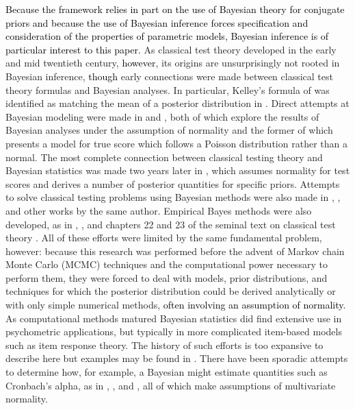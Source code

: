 \documentclass[12pt,epsfig]{article}
\newcommand{\change}[1]{\textcolor{black}{#1}}
\begin{document}
 \change{Because the framework relies in part on the use of Bayesian theory for conjugate priors and because the use of Bayesian inference forces specification and consideration of the properties of parametric models, Bayesian inference is of particular interest to this paper.} As classical test theory developed in the early and mid twentieth century, \change{however}, its origins are unsurprisingly not rooted in Bayesian inference, \change{though} early connections were made between classical test theory formulas and Bayesian analyses. In particular, Kelley's formula of \cite{Kelley1923} was identified as matching the mean of a posterior distribution in \cite{Novick1969}. Direct attempts at Bayesian modeling were made in \cite{Novick1969_thefirst} and \cite{Novick1969_thesecond}, both of which explore the results of Bayesian analyses under the assumption of normality and the former of which presents a model for true score which follows a Poisson distribution rather than a normal. The most complete connection between classical testing theory and Bayesian statistics was made two years later in \cite{Novick1971}, which assumes normality for test scores and derives a number of posterior quantities for specific priors. Attempts to solve classical testing problems using Bayesian methods were also made in \cite{Lindley1969}, \cite{Lindley1969b}, and other works by the same author. Empirical Bayes methods were also developed, as in \cite{Lord1965}, \cite{Lord1969}, and chapters 22 and 23 of the seminal text on classical test theory \cite{Lord1968}.  All of these efforts were limited by the same fundamental problem, however: because this research was performed before the advent of Markov chain Monte Carlo (MCMC) techniques and the computational power necessary to perform them, they were forced to deal with models, prior distributions, and techniques for which the posterior distribution could be derived analytically or with only simple numerical methods, \change{often involving an assumption of normality}. As computational methods matured Bayesian statistics did find extensive use in psychometric applications, but typically in more complicated item-based models such as item response theory. The history of such efforts is too expansive to describe here but examples may be found in \cite{Levy2016}. There have been sporadic attempts to determine how, for example, a Bayesian might estimate quantities such as Cronbach's alpha, as in \cite{Li2002}, \cite{Padilla2011}, and \citep{Najafabadi2016}, all of which make assumptions of multivariate normality. 
\end{document}
